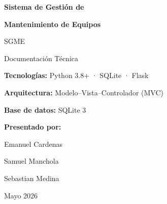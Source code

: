 \documentclass[12pt, a4paper]{article}
\begin{document}
\begin{titlepage}
    \centering
    \vspace*{2cm}

    {\Huge\bfseries\textcolor{primary}{Sistema de Gestión de}\par}
    \vspace{0.3cm}
    {\Huge\bfseries\textcolor{primary}{Mantenimiento de Equipos}\par}
    \vspace{0.5cm}
    {\Large\textcolor{secondary}{SGME}\par}

    \vspace{0.8cm}
    {\large Documentación Técnica\par}

    \vspace{1.5cm}


    \vspace{1.2cm}

    {\large\textbf{Tecnologías:} Python 3.8+ · SQLite · Flask\par}
    \vspace{0.4cm}
    {\large\textbf{Arquitectura:} Modelo--Vista--Controlador (MVC)\par}
    \vspace{0.4cm}
    {\large\textbf{Base de datos:} SQLite 3\par}

    \vspace{1.5cm}


    \vspace{1cm}

    {\large\textbf{Presentado por:}\par}
    \vspace{0.4cm}
    {\Large Emanuel Cardenas\par}
    \vspace{0.2cm}
    {\Large Samuel Manchola\par}
    \vspace{0.2cm}
    {\Large Sebastian Medina\par}

    \vfill
    {\large Mayo 2026\par}
\end{titlepage}
\end{document}
